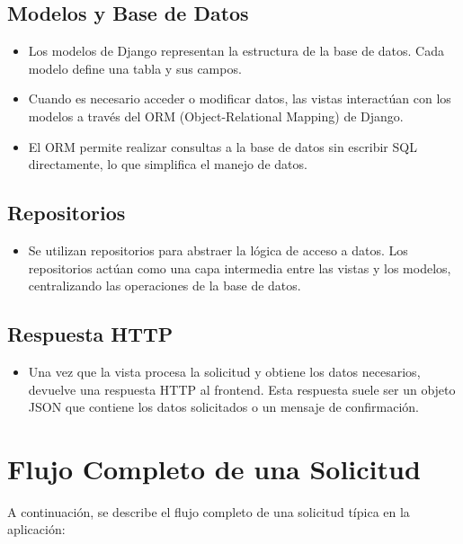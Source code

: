 \documentclass{report}
\begin{document}
    \subsection*{Modelos y Base de Datos}
    \begin{itemize}
        \item Los modelos de Django representan la estructura de la base de datos. Cada modelo define una tabla y sus campos.
        \item Cuando es necesario acceder o modificar datos, las vistas interactúan con los modelos a través del ORM (Object-Relational Mapping) de Django.
        \item El ORM permite realizar consultas a la base de datos sin escribir SQL directamente, lo que simplifica el manejo de datos.
    \end{itemize}
    
    \subsection*{Repositorios}
    \begin{itemize}
        \item Se utilizan repositorios para abstraer la lógica de acceso a datos. Los repositorios actúan como una capa intermedia entre las vistas y los modelos, centralizando las operaciones de la base de datos.
    \end{itemize}
    
    \subsection*{Respuesta HTTP}
    \begin{itemize}
        \item Una vez que la vista procesa la solicitud y obtiene los datos necesarios, devuelve una respuesta HTTP al frontend. Esta respuesta suele ser un objeto JSON que contiene los datos solicitados o un mensaje de confirmación.
    \end{itemize}
    
    \section*{Flujo Completo de una Solicitud}
    A continuación, se describe el flujo completo de una solicitud típica en la aplicación:
    
\end{document}
